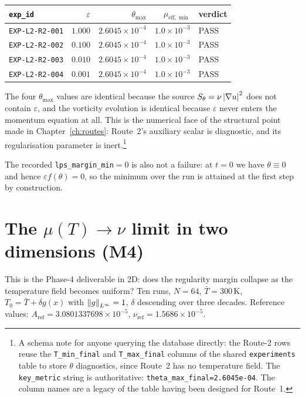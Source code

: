\begin{center}
\small
\begin{tabular}{@{}l r r r l@{}}
\toprule
\texttt{exp\_id} & \(\varepsilon\) & \(\theta_{\max}\) &
\(\mu_{\mathrm{eff},\min}\) & verdict \\
\midrule
\texttt{EXP-L2-R2-001} & \(1.000\) & \(2.6045\!\times\!10^{-4}\) & \(1.0\!\times\!10^{-3}\) & \textsf{PASS} \\
\texttt{EXP-L2-R2-002} & \(0.100\) & \(2.6045\!\times\!10^{-4}\) & \(1.0\!\times\!10^{-3}\) & \textsf{PASS} \\
\texttt{EXP-L2-R2-003} & \(0.010\) & \(2.6045\!\times\!10^{-4}\) & \(1.0\!\times\!10^{-3}\) & \textsf{PASS} \\
\texttt{EXP-L2-R2-004} & \(0.001\) & \(2.6045\!\times\!10^{-4}\) & \(1.0\!\times\!10^{-3}\) & \textsf{PASS} \\
\bottomrule
\end{tabular}
\end{center}

\medskip
The four \(\theta_{\max}\) values are identical because the source
\(S_\theta=\nu\left|\nabla u\right|^2\) does not contain \(\varepsilon\), and the
vorticity evolution is identical because \(\varepsilon\) never enters the
momentum equation at all. This is the numerical face of the structural point
made in Chapter~\ref{ch:routes}: Route~2's auxiliary scalar is diagnostic, and
its regularisation parameter is inert.\footnote{A schema note for anyone
querying the database directly: the Route-2 rows reuse the
\texttt{T\_min\_final} and \texttt{T\_max\_final} columns of the shared
\texttt{experiments} table to store \(\theta\) diagnostics, since Route~2 has
no temperature field. The \texttt{key\_metric} string is authoritative:
\texttt{theta\_max\_final=2.6045e-04}. The column names are a legacy of the
table having been designed for Route~1.}

The recorded \texttt{lps\_margin\_min}\(=0\) is also not a failure: at \(t=0\)
we have \(\theta\equiv0\) and hence \(\varepsilon f(\theta)=0\), so the
minimum over the run is attained at the first step by construction.

\section{The \texorpdfstring{\(\mu(T)\to\nu\)}{mu -> nu} limit in two dimensions (M4)}
\label{sec:mu-limit-2d}

This is the Phase-4 deliverable in 2D: does the regularity margin collapse as
the temperature field becomes uniform? Ten runs, \(N=64\),
\(\bar T=300\,\mathrm{K}\), \(T_0=\bar T+\delta g(x)\) with
\(\left\|g\right\|_{L^\infty}=1\), \(\delta\) descending over three decades. Reference
values: \(A_{\mathrm{ref}}=3.0801337698\times10^{-5}\),
\(\nu_{\mathrm{ref}}=1.5686\times10^{-5}\).

